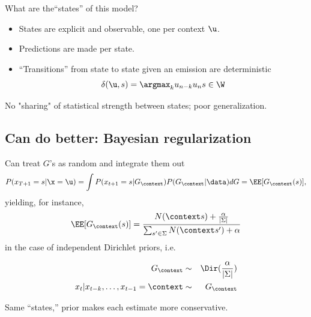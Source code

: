 \documentclass[16pt]{beamer}
\begin{document}
\begin{frame}[t]{}
What are the``states'' of this model?
\begin{itemize}
\item States are explicit and observable, one per context $\u$.
\item Predictions are made per state.
\item ``Transitions'' from state to state given an emission are deterministic 
\[\delta(\u,s) =  \argmax_k u_{n-k}u_{n}s \in \W \]
\end{itemize}
No "sharing" of statistical strength between states; poor generalization.
\end{frame}

\subsection{Can do better: Bayesian regularization}
\begin{frame}[t]{}
Can treat $G$'s as random and integrate them out
\begin{align*}
P(x_{T+1}=s|\x= \u) = \int P(x_{t+1}=s|G_\context)P(G_\context|\data)dG = {\EE[G_\context(s)] } ,
\end{align*}
yielding, for instance,
\begin{align*}
\EE[G_\context(s)]=\frac{N(\context s) + \frac{\alpha}{|\Sigma|}}{\sum_{s'\in\Sigma}N(\context s') + \alpha}
\end{align*}
in the case of independent Dirichlet priors, i.e.
\vspace{-.5cm}
\begin{center}
\begin{eqnarray*}
G_\context &\sim& \Dir(\frac{\alpha}{|\Sigma|}) \\
x_t | x_{t-k},\ldots,x_{t-1} = \context &\sim& G_\context
\end{eqnarray*}
\end{center}
Same ``states,'' prior makes each estimate more conservative.


\end{frame}
\end{document}
